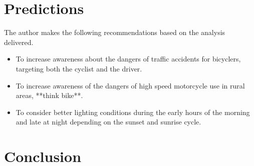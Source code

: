 \documentclass[12pt]{article}
\begin{document}
\section{Predictions}

The author makes the following recommendations based on the analysis delivered.
\begin{itemize}
\item To increase awareness about the dangers of traffic accidents for bicyclers, targeting both the cyclist and the driver.
\item To increase awareness of the dangers of high speed motorcycle use in rural areas, **think bike**. 
\item To consider better lighting conditions during the early hours of the morning and late at night depending on the sunset and sunrise cycle.
\end{itemize}

\section{Conclusion}



\end{document}
